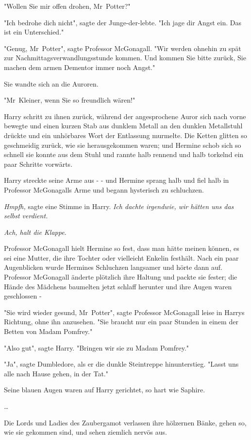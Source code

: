 {"Wollen Sie mir offen drohen, Mr~Potter?"

"Ich bedrohe dich nicht", sagte der Junge-der-lebte. "Ich jage dir Angst ein. Das ist ein Unterschied."

"Genug, Mr~Potter", sagte Professor McGonagall. "Wir werden ohnehin zu spät zur Nachmittagsverwandlungsstunde kommen. Und kommen Sie bitte zurück, Sie machen dem armen Dementor immer noch Angst."

Sie wandte sich an die Auroren.

"Mr~Kleiner, wenn Sie so freundlich wären!"

Harry schritt zu ihnen zurück, während der angesprochene Auror sich nach vorne bewegte und einen kurzen Stab aus dunklem Metall an den dunklen Metallstuhl drückte und ein unhörbares Wort der Entlassung murmelte. Die Ketten glitten so geschmeidig zurück, wie sie herausgekommen waren; und Hermine schob sich so schnell sie konnte aus dem Stuhl und rannte halb rennend und halb torkelnd ein paar Schritte vorwärts.

Harry streckte seine Arme aus - - und Hermine sprang halb und fiel halb in Professor McGonagalls Arme und begann hysterisch zu schluchzen.

\emph{Hmpfh,} sagte eine Stimme in Harry. \emph{Ich dachte irgendwie, wir hätten uns das selbst verdient.}

\emph{Ach, halt die Klappe.}

Professor McGonagall hielt Hermine so fest, dass man hätte meinen können, es sei eine Mutter, die ihre Tochter oder vielleicht Enkelin festhält. Nach ein paar Augenblicken wurde Hermines Schluchzen langsamer und hörte dann auf. Professor McGonagall änderte plötzlich ihre Haltung und packte sie fester; die Hände des Mädchens baumelten jetzt schlaff herunter und ihre Augen waren geschlossen -

"Sie wird wieder gesund, Mr~Potter", sagte Professor McGonagall leise in Harrys Richtung, ohne ihn anzusehen. "Sie braucht nur ein paar Stunden in einem der Betten von Madam Pomfrey."

"Also gut", sagte Harry. "Bringen wir sie zu Madam Pomfrey."

"Ja", sagte Dumbledore, als er die dunkle Steintreppe hinunterstieg. "Lasst uns alle nach Hause gehen, in der Tat."

Seine blauen Augen waren auf Harry gerichtet, so hart wie Saphire.

…

Die Lords und Ladies des Zaubergamot verlassen ihre hölzernen Bänke, gehen so, wie sie gekommen sind, und sehen ziemlich nervös aus.

}
